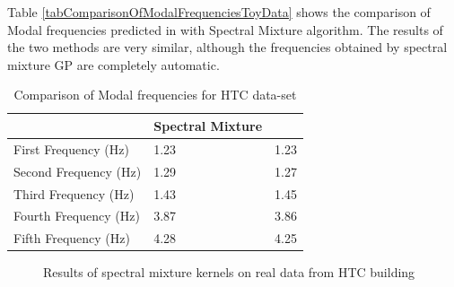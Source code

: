 Table \ref{tabComparisonOfModalFrequenciesToyData} shows the comparison of Modal frequencies predicted in \cite{brincker2000modal} with Spectral Mixture algorithm. The results of the two methods are very similar, although the frequencies obtained by spectral mixture GP are completely automatic. 

\renewcommand{\arraystretch}{1}
\begin{table}[!ht]
    \centering
\begin{tabular}{|l|l|l|}
  \hline
    & Spectral Mixture & \cite{brincker2000modal} \\
  \hline 
  \hline
First Frequency (Hz) & 1.23 & 1.23\\
Second Frequency (Hz)  & 1.29 & 1.27\\
Third Frequency (Hz) & 1.43 & 1.45\\
Fourth Frequency (Hz) & 3.87 & 3.86\\
Fifth Frequency (Hz) & 4.28 & 4.25\\
   \hline
\end{tabular}
\caption{Comparison of Modal frequencies for HTC data-set}
  \label{tabComparisonOfModalFrequenciesHTCData}
\end{table}

\begin{figure}[!ht]
  \centering
  \quad
    \quad
  
  \caption{Results of spectral mixture kernels on real data from HTC building}
\end{figure}

